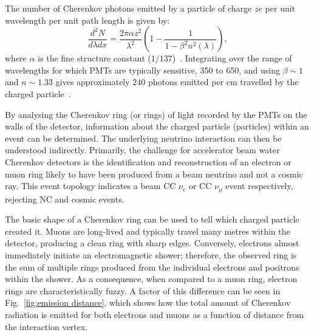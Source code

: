 The number of Cherenkov photons emitted by a particle of charge $ze$ per unit wavelength per unit
path length is given by:
\begin{equation}
    \frac{d^{2}N}{d\lambda dx}=\frac{2\pi\alpha z^{2}}{\lambda^{2}}
    \left(1-\frac{1}{1-\beta^{2}n^{2}(\lambda)}\right),
    \label{eq:cherenkov_emission}
\end{equation}
where $\alpha$ is the fine structure constant ($1/137$)~\cite{particle2020}. Integrating over the
range of wavelengths for which PMTs are typically sensitive, \unit{350}{} to
\unit{650}{}, and using $\beta\sim 1$ and $n\sim 1.33$ gives approximately $240$
photons emitted per cm travelled by the charged particle~\cite{perch2017}.

By analysing the Cherenkov ring (or rings) of light recorded by the PMTs on the walls of the
detector, information about the charged particle (particles) within an event can be determined.
The underlying neutrino interaction can then be understood indirectly. Primarily, the challenge
for accelerator beam water Cherenkov detectors is the identification and reconstruction of an
electron or muon ring likely to have been produced from a beam neutrino and not a cosmic ray. This
event topology indicates a beam CC $\nu_{e}$ or CC $\nu_{\mu}$ event respectively, rejecting NC
and cosmic events.

The basic shape of a Cherenkov ring can be used to tell which charged particle created it. Muons
are long-lived and typically travel many metres within the detector, producing a clean ring with
sharp edges. Conversely, electrons almost immediately initiate an electromagnetic shower;
therefore, the observed ring is the sum of multiple rings produced from the individual electrons
and positrons within the shower. As a consequence, when compared to a muon ring, electron rings
are characteristically fuzzy. A factor of this difference can be seen in Fig.~\ref{fig:emission
    distance}, which shows how the total amount of Cherenkov radiation is emitted for both electrons
and muons as a function of distance from the interaction vertex.

